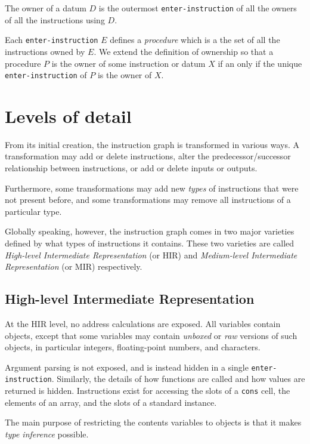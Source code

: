 The owner of a datum $D$ is the outermost \texttt{enter-instruction}
of all the owners of all the instructions using $D$.

Each \texttt{enter-instruction} $E$ defines a \emph{procedure} which
is a the set of all the instructions owned by $E$.  We extend the
definition of ownership so that a procedure $P$ is the owner of some
instruction or datum $X$ if an only if the unique
\texttt{enter-instruction} of $P$ is the owner of $X$.

\section{Levels of detail}

From its initial creation, the instruction graph is transformed in
various ways.  A transformation may add or delete instructions, alter
the predecessor/successor relationship between instructions, or add or
delete inputs or outputs.

Furthermore, some transformations may add new \emph{types} of
instructions that were not present before, and some transformations
may remove all instructions of a particular type.

Globally speaking, however, the instruction graph comes in two major
varieties defined by what types of instructions it contains.  These
two varieties are called \emph{High-level Intermediate Representation}
(or HIR) and \emph{Medium-level Intermediate Representation} (or MIR)
respectively.

\subsection{High-level Intermediate Representation}

At the HIR level, no address calculations are exposed.  All variables
contain \commonlisp{} objects, except that some variables may contain
\emph{unboxed} or \emph{raw} versions of such objects, in particular
integers, floating-point numbers, and characters.

Argument parsing is not exposed, and is instead hidden in a single
\texttt{enter-instruction}.  Similarly, the details of how functions
are called and how values are returned is hidden.  Instructions exist
for accessing the slots of a \texttt{cons} cell, the elements of an
array, and the slots of a standard instance.

The main purpose of restricting the contents variables to
\commonlisp{} objects is that it makes \emph{type inference}
possible.

